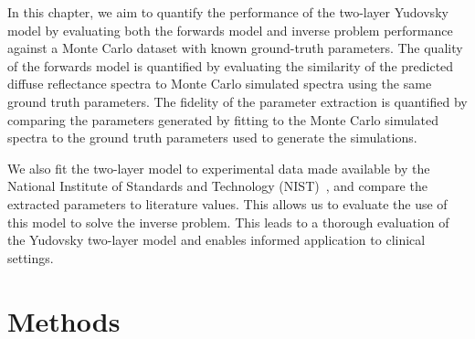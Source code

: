 In this chapter, we aim to quantify the performance of the two-layer Yudovsky model by evaluating both the forwards model and inverse problem performance against a Monte Carlo dataset with known ground-truth parameters. The quality of the forwards model is quantified by evaluating the similarity of the predicted diffuse reflectance spectra to Monte Carlo simulated spectra using the same ground truth parameters. The fidelity of the parameter extraction is quantified by comparing the parameters generated by fitting to the Monte Carlo simulated spectra to the ground truth parameters used to generate the simulations.

We also fit the two-layer model to experimental data made available by the National Institute of Standards and Technology (NIST)~\citep{Cooksey2017}, and compare the extracted parameters to literature values. This allows us to evaluate the use of this model to solve the inverse problem.
This leads to a thorough evaluation of the Yudovsky two-layer model and enables informed application to clinical settings. 

\section{Methods}\label{sec:methods2}

